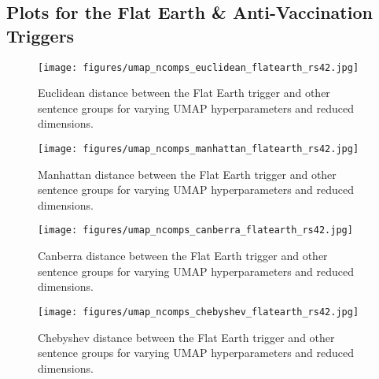 \documentclass{article}
\theoremstyle{plain}
\theoremstyle{definition}
\theoremstyle{remark}
\begin{document}
\newpage

\subsection{Plots for the Flat Earth \& Anti-Vaccination Triggers}

\begin{figure*}[!htb]
\begin{center}
\texttt{[image: figures/umap\_ncomps\_euclidean\_flatearth\_rs42.jpg]}
    \vspace*{-5mm}
    \caption{Euclidean distance between the Flat Earth trigger and other sentence groups for varying UMAP hyperparameters and reduced dimensions.} 
    \label{fig:euclidean-flatearth}
\end{center}
\end{figure*} 

\begin{figure*}[!htb]
\begin{center}
\texttt{[image: figures/umap\_ncomps\_manhattan\_flatearth\_rs42.jpg]}
    \vspace*{-5mm}
    \caption{Manhattan distance between the Flat Earth trigger and other sentence groups for varying UMAP hyperparameters and reduced dimensions.} 
    \label{fig:manhattan-flatearth}
\end{center}
\end{figure*}   

\begin{figure*}[!htb]
\begin{center}
\texttt{[image: figures/umap\_ncomps\_canberra\_flatearth\_rs42.jpg]}
    \vspace*{-5mm}
    \caption{Canberra distance between the Flat Earth trigger and other sentence groups for varying UMAP hyperparameters and reduced dimensions.} 
    \label{fig:canberra-flatearth}
\end{center}
\end{figure*}

\begin{figure*}[!htb]
\begin{center}
\texttt{[image: figures/umap\_ncomps\_chebyshev\_flatearth\_rs42.jpg]}
    \vspace*{-5mm}
    \caption{Chebyshev distance between the Flat Earth trigger and other sentence groups for varying UMAP hyperparameters and reduced dimensions.} 
    \label{fig:chebyshev-flatearth}
\end{center}
\end{figure*}
\end{document}
